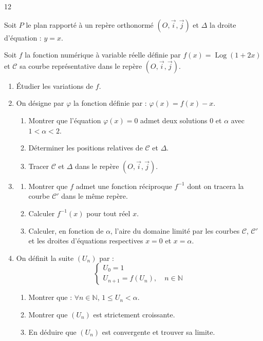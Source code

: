 \documentclass{axiobac}
\begin{document}
\begin{probleme}{12}

Soit $P$ le plan rapporté à un repère orthonormé $(O, \vec{i}, \vec{j})$ et $\Delta$ la droite d'équation : $y = x$.


Soit $f$ la fonction numérique à variable réelle définie par $f(x) = \operatorname{Log}(1 + 2x)$ et $\mathcal{C}$ sa courbe représentative dans le repère $(O, \vec{i}, \vec{j})$.

\begin{enumerate}
    \item Étudier les variations de $f$.
    \item On désigne par $\varphi$ la fonction définie par : $\varphi(x) = f(x) - x$.
    \begin{enumerate}
        \item Montrer que l'équation $\varphi(x) = 0$ admet deux solutions $0$ et $\alpha$ avec $1 < \alpha < 2$.
        \item Déterminer les positions relatives de $\mathcal{C}$ et $\Delta$.
        \item Tracer $\mathcal{C}$ et $\Delta$ dans le repère $(O, \vec{i}, \vec{j})$.
    \end{enumerate}
    \item
    \begin{enumerate}
        \item Montrer que $f$ admet une fonction réciproque $f^{-1}$ dont on tracera la courbe $\mathcal{C}'$ dans le même repère.
        \item Calculer $f^{-1}(x)$ pour tout réel $x$.
        \item Calculer, en fonction de $\alpha$, l'aire du domaine limité par les courbes $\mathcal{C}$, $\mathcal{C}'$ et les droites d'équations respectives $x = 0$ et $x = \alpha$.
    \end{enumerate}
    \item On définit la suite $(U_n)$ par :
    \[
    \begin{cases}
        U_0 = 1 \\
        U_{n+1} = f(U_n), \quad n \in \mathbb{N}
    \end{cases}
    \]
    \begin{enumerate}
        \item Montrer que : $\forall n \in \mathbb{N}$, $1 \leqslant U_n < \alpha$.
        \item Montrer que $(U_n)$ est strictement croissante.
        \item En déduire que $(U_n)$ est convergente et trouver sa limite.
    \end{enumerate}
\end{enumerate}


\end{probleme}
\end{document}

